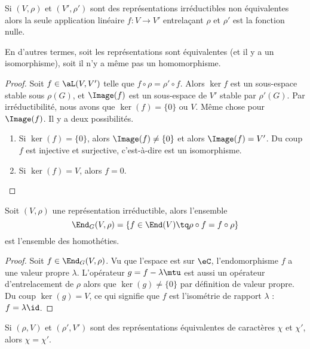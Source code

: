 \begin{theorem}    \label{ThoyftobH}
	Si \( (V,\rho)\) et \( (V',\rho')\) sont des représentations irréductibles non équivalentes alors la seule application linéaire \( f\colon V\to V'\) entrelaçant \( \rho\) et \( \rho'\) est la fonction nulle.

	En d'autres termes, soit les représentations sont équivalentes (et il y a un isomorphisme), soit il n'y a même pas un homomorphisme.
\end{theorem}

\begin{proof}
	Soit \( f\in\aL(V,V')\) telle que \( f\circ \rho=\rho'\circ f\). Alors \( \ker f\) est un sous-espace stable sous \( \rho(G)\), et \( \Image(f)\) est un sous-espace de \( V'\) stable par \( \rho'(G)\). Par irréductibilité, nous avons que \( \ker(f)=\{ 0 \}\) ou \( V\). Même chose pour \( \Image(f)\). Il y a deux possibilités.
	\begin{enumerate}
		\item
		      Si \( \ker(f)=\{ 0 \}\), alors \( \Image(f)\neq \{ 0 \}\) et alors \( \Image(f)=V'\). Du coup \( f\) est injective et surjective, c'est-à-dire est un isomorphisme.
		\item
		      Si \( \ker(f)=V\), alors \( f=0\).
	\end{enumerate}
\end{proof}

\begin{corollary}
	Soit \( (V,\rho)\) une représentation irréductible, alors l'ensemble
	\begin{equation}
		\End_{G}(V,\rho)=\{ f\in\End(V)\tq \rho\circ f=f\circ \rho \}
	\end{equation}
	est l'ensemble des homothéties.
\end{corollary}

\begin{proof}
	Soit \( f\in\End_{G}(V,\rho)\). Vu que l'espace est sur \( \eC\), l'endomorphisme \( f\) a une valeur propre \( \lambda\). L'opérateur \( g=f-\lambda\mtu\) est aussi un opérateur d'entrelacement de \( \rho\) alors que \( \ker(g)\neq \{ 0 \}\) par définition de valeur propre. Du coup \( \ker(g)=V\), ce qui signifie que \( f\) est l'isométrie de rapport \( \lambda\) : \( f=\lambda\id\).
\end{proof}

\begin{lemma}   \label{LempUSOlo}
	Si \( (\rho,V)\) et \( (\rho',V')\) sont des représentations équivalentes de caractères \( \chi\) et \( \chi'\), alors \( \chi=\chi'\).
\end{lemma}

